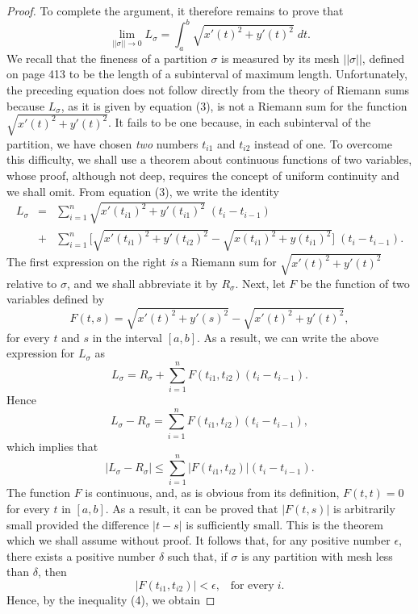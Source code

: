 \begin{proof}
To complete the argument, it therefore remains to prove that 
$$
\lim_{|| \sigma || \rightarrow 0} L_\sigma = \int_a^b \sqrt{x'(t)^2 + y'(t)^2} \;dt. 
$$
We recall that the fineness of a partition $\sigma$ is measured by its mesh $|| \sigma ||$, defined on page 413 to be the length of a subinterval of maximum length.
Unfortunately, the preceding equation does not follow directly from the theory of Riemann sums because $L_\sigma$, as it is given by equation (3), is not a Riemann sum for the function $\sqrt{x'(t)^2 + y'(t)^2}$. It fails to be one because, in each subinterval of the partition, we have chosen \textit{two} numbers $t_{i1}$ and $t_{i2}$ instead of one. To overcome this difficulty, we shall use a theorem about continuous functions of two variables, whose proof, although not deep, requires the concept of uniform continuity and we shall omit. From equation (3), we write the identity
\begin{eqnarray*}
L_\sigma 
&=& \sum_{i=1}^n \sqrt{x'(t_{i1})^2 + y'(t_{i1})^2} \;(t_i - t_{i-1})  \\
&+& \sum_{i=1}^n  \Big[\sqrt{x'(t_{i1})^2 + y'(t_{i2})^2} - \sqrt {x(t_{i1})^2 + y (t_{i1})^2} \Big] \;(t_i - t_{i-1}) .
\end{eqnarray*}
The first expression on the right \textit{is} a Riemann sum for $\sqrt{x'(t)^2 + y'(t)^2}$ relative to $\sigma$, and we shall abbreviate it by $R_\sigma$. Next, let $F$ be the function of two variables defined by
$$
F(t, s) = \sqrt{x'(t)^2 + y'(s)^2} - \sqrt{x'(t)^2 + y'(t)^2},
$$
for every $t$ and $s$ in the interval $[a, b]$. As a result, we can write the above expression for $L_\sigma$ as
$$
L_\sigma = R_\sigma + \sum_{i=1}^n F(t_{i1}, t_{i2})(t_i - t_{i-1}).
$$
Hence  
$$
L_\sigma - R_\sigma = \sum_{i=1}^n F(t_{i1}, t_{i2})(t_i - t_{i-1}),  
$$
which implies that
\begin{equation}
|L_\sigma - R_\sigma| \leq \sum_{i=1}^n |F(t_{i1}, t_{i2})| (t_i - t_{i-1}). 
\label{eq10.2.4}
\end{equation}
The function $F$ is continuous, and, as is obvious from its definition, $F(t, t) = 0$ for every $t$ in $[a, b]$. As a result, it can be proved that $|F(t, s)|$ is arbitrarily small provided the difference $|t - s|$ is sufficiently small. This is the theorem which we shall assume without proof. It follows that, for any positive number $\epsilon$, there exists a positive number $\delta$ such that, if $\sigma$ is any partition with mesh less than $\delta$, then
$$
|F(t_{i1}, t_{i2})| < \epsilon, \;\;\;\mbox{for every}\; i.
$$
Hence, by the inequality (4), we obtain

\end{proof}

